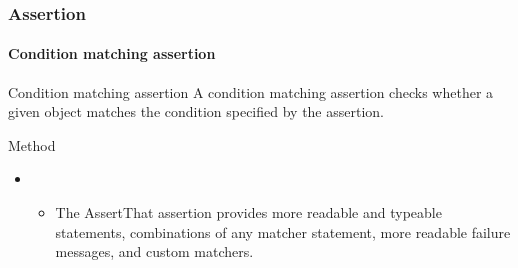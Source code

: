 \begin{frame}[parent={concept:assertion}, hasprev=false, hasnext=false]
\frametitle{Assertion}
\framesubtitle{Condition matching assertion}
\label{concept:junit-condition-matching-assertion}
\label{concept:condition-matching-assertion}

\begin{block:concept}{Condition matching assertion}
A condition matching assertion checks whether a given object matches the
condition specified by the assertion.
\end{block:concept}

\begin{block:fact}{Method}
\begin{itemize}
	\item {}
	\begin{itemize}
		\item The AssertThat assertion provides more readable and typeable
		statements, combinations of any matcher statement, more readable
		failure messages, and custom matchers.
	\end{itemize}
\end{itemize}
\end{block:fact}

\hfill
{}
\end{frame}